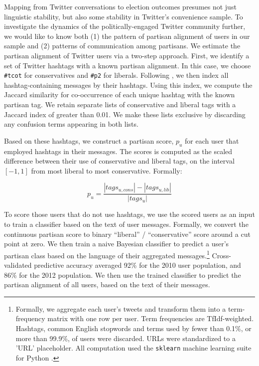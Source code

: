 \documentclass{acm_proc_article-sp}
\begin{document}
Mapping from Twitter conversations to election outcomes presumes not
just linguistic stability, but also some stability in Twitter's
convenience sample. To investigate the dynamics of the
politically-engaged Twitter community further, we would like to know
both (1) the pattern of partisan alignment of users in our sample and
(2) patterns of communication among partisans. We estimate the
partisan alignment of Twitter users via a two-step approach. First, we
identify a set of Twitter hashtags with a known partisan alignment. In
this case, we choose \texttt{\#tcot} for conservatives and
\texttt{\#p2} for liberals. Following \cite{conover2011}, we then
index all hashtag-containing messages by their hashtags. Using this
index, we compute the Jaccard similarity for co-occurrence of each
unique hashtag with the known partisan tag. We retain separate lists
of conservative and liberal tags with a Jaccard index of greater than
0.01. We make these lists exclusive by discarding any confusion terms
appearing in both lists.

Based on these hashtags, we construct a partisan score, $p_u$ for each
user that employed hashtags in their messages. The scores is computed
as the scaled difference between their use of conservative and liberal
tags, on the interval $[-1, 1]$ from most liberal to most
conservative. Formally:

 \begin{equation}
   \label{eq:pscore}
   p_u = \frac{\left|tags_{u,cons}\right| - \left|tags_{u, lib}\right|}{\left|tags_u\right|}
 \end{equation}

To score those users that do not use hashtags, we use the scored users
as an input to train a classifier based on the text of user
messages. Formally, we convert the continuous partisan score to binary
``liberal'' / ``conservative'' score around a cut point at zero. We
then train a naive Bayesian classifier to predict a user's
partisan class based on the language of their aggregated
messages.\footnote{Formally, we aggregate each user's tweets and
transform them into a term-frequency matrix with one row per
user. Term frequencies are TfIdf-weighted. Hashtags,
common English stopwords and terms used by fewer than 0.1\%, or more
than 99.9\%, of users were discarded. URLs were standardized to a
'URL' placeholder. All computation used the \texttt{sklearn} machine
learning suite for Python \cite{scikit-learn}.} Cross-validated
predictive accuracy averaged 92\% for the 2010 user population, and
86\% for the 2012 population. We then use the trained classifier to
predict the partisan alignment of all users, based on the text of
their messages.
\end{document}
